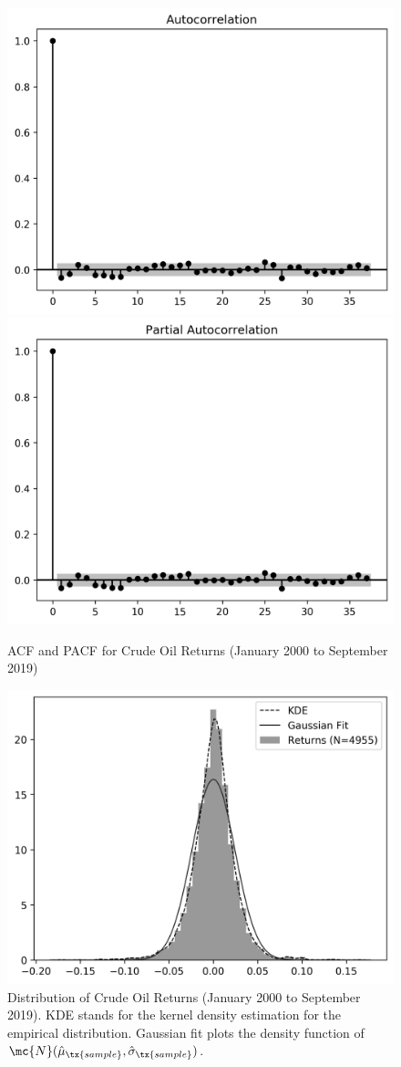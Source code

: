 \documentclass[12pt]{article}
\begin{document}
	\begin{figure}[H]
		\small
		\centering
		\includegraphics[width=0.45\linewidth]{figures/wti_summary/returns_acf.png}
		\includegraphics[width=0.45\linewidth]{figures/wti_summary/returns_pacf.png}
		\caption{ACF and PACF for Crude Oil Returns (January 2000 to September 2019)}
	\end{figure}

	\begin{figure}[H]
		\centering
		\includegraphics{figures/wti_summary/return_hist.png}
		\caption{Distribution of Crude Oil Returns (January 2000 to September 2019). KDE stands for the kernel density estimation for the empirical distribution. Gaussian fit plots the density function of $\mc{N}(\hat{\mu}_\tx{sample}, \hat{\sigma}_\tx{sample})$.}
	\end{figure}
\end{document}

